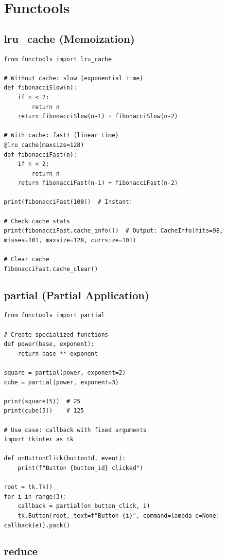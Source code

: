 \section{Functools}

\subsection{lru\_cache (Memoization)}

\begin{lstlisting}
from functools import lru_cache

# Without cache: slow (exponential time)
def fibonacciSlow(n):
    if n < 2:
        return n
    return fibonacciSlow(n-1) + fibonacciSlow(n-2)

# With cache: fast! (linear time)
@lru_cache(maxsize=128)
def fibonacciFast(n):
    if n < 2:
        return n
    return fibonacciFast(n-1) + fibonacciFast(n-2)

print(fibonacciFast(100))  # Instant!

# Check cache stats
print(fibonacciFast.cache_info())  # Output: CacheInfo(hits=98, misses=101, maxsize=128, currsize=101)

# Clear cache
fibonacciFast.cache_clear()
\end{lstlisting}

\subsection{partial (Partial Application)}

\begin{lstlisting}
from functools import partial

# Create specialized functions
def power(base, exponent):
    return base ** exponent

square = partial(power, exponent=2)
cube = partial(power, exponent=3)

print(square(5))  # 25
print(cube(5))    # 125

# Use case: callback with fixed arguments
import tkinter as tk

def onButtonClick(buttonId, event):
    print(f"Button {button_id} clicked")

root = tk.Tk()
for i in range(3):
    callback = partial(on_button_click, i)
    tk.Button(root, text=f"Button {i}", command=lambda e=None: callback(e)).pack()
\end{lstlisting}

\subsection{reduce}

